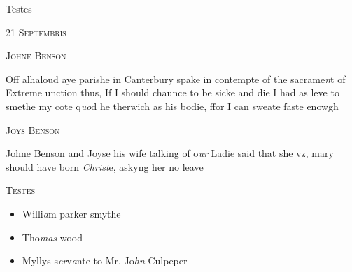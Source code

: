 \documentclass[12pt, a4paper]{book}
\begin{document}
		\ifthenelse{\isodd{\thepage}}
		{\reversemarginpar}
		{\normalmarginpar}
		
		
		Testes

 

            
            
               
				\begin{center} \begin{large} {\scshape 
                  21 Septembris
               } \end{large} \end{center}
			
               
               	
				\begin{center}  {\scshape Johne Benson}  \end{center}
			
               	
               		
				\marginpar[\vspace{0.5cm}{\textcolor{Gray}{offensive}}]{}
			
               		
		\ifthenelse{\isodd{\thepage}}
		{\reversemarginpar}
		{\normalmarginpar}
		Off alhaloud aye parishe in Canterbury spake
 in contempte of the sacrame\textit{n}t of Extreme unction
  thus, If I should chaunce to be sicke and die
 I had as leve to smethe my cote q\textit{uo}d he therwich
 as his bodie, ffor I can sweate faste enowgh
 

               
               	
				\begin{center}  {\scshape Joys Benson}  \end{center}
			
               	
               		
			
               		
		\ifthenelse{\isodd{\thepage}}
		{\reversemarginpar}
		{\normalmarginpar}
		Johne Benson and Joyse his wife talking of o\textit{ur}
  Ladie said that she vz, mary should have born
 \textit{Christ}e, askyng her no leave

	\begin{center} {\scshape Testes} \end{center}\begin{itemize}
		
		\item[]Willi\textit{a}m parker smythe
		\item[]Tho\textit{mas} wood
		\item[]Myllys s\textit{er}v\textit{a}nte to Mr.
 Jo\textit{hn} Culpeper
\end{itemize}
 
\end{document}
